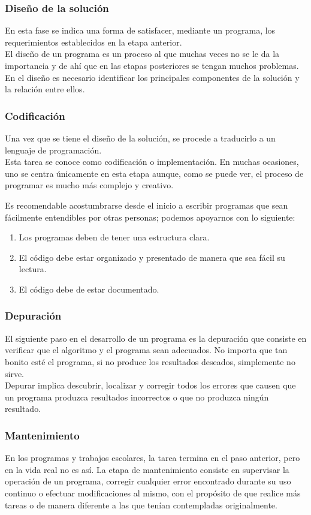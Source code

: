 \begin{frame}
\frametitle{Diseño de la soluci\'{o}n}
En esta fase se indica una forma de satisfacer, mediante un programa, los requerimientos establecidos en la etapa anterior.
\\
\bigskip
El diseño de un programa es un proceso al que muchas veces no se le da la importancia y de ah\'{i} que en las etapas posteriores se tengan muchos problemas.
\\
\medskip
En el diseño es necesario identificar los principales componentes de la soluci\'{o}n y la relaci\'{o}n entre ellos.
\end{frame}
\begin{frame}
\frametitle{Codificaci\'{o}n}
Una vez que se tiene el diseño de la soluci\'{o}n, se procede a traducirlo a un lenguaje de programaci\'{o}n.
\\
\bigskip
Esta tarea se conoce como codificaci\'{o}n o implementaci\'{o}n. En muchas ocasiones, uno se centra \'{u}nicamente en esta etapa aunque, como se puede ver, el proceso de programar es mucho m\'{a}s complejo y creativo.
\end{frame}
\begin{frame}[fragile]
Es recomendable acostumbrarse desde el inicio a escribir programas que sean f\'{a}cilmente entendibles por otras personas; podemos apoyarnos con lo siguiente:
\begin{enumerate}[<+->]
\item Los programas deben de tener una estructura clara.
\item El c\'{o}digo debe estar organizado y presentado de manera que sea f\'{a}cil su lectura.
\item El c\'{o}digo debe de estar documentado.
\end{enumerate}
\end{frame}
\begin{frame}
\frametitle{Depuraci\'{o}n}
El siguiente paso en el desarrollo de un programa es la depuraci\'{o}n que consiste en verificar que el algoritmo y el programa sean adecuados. No importa que tan bonito est\'{e} el programa, si no produce los resultados deseados, simplemente no sirve.
\\
\bigskip
Depurar implica descubrir, localizar y corregir todos los errores que causen que un programa produzca resultados incorrectos o que no produzca ning\'{u}n resultado.
\end{frame}
\begin{frame}
\frametitle{Mantenimiento}
En los programas y trabajos escolares, la tarea termina en el paso anterior, pero en la vida real no es as\'{i}. La etapa de mantenimiento consiste en supervisar la operaci\'{o}n de un programa, corregir cualquier error encontrado durante su uso continuo o efectuar modificaciones al mismo, con el prop\'{o}sito de que realice m\'{a}s tareas o de manera diferente a las que ten\'{i}an contempladas originalmente.
\end{frame}
